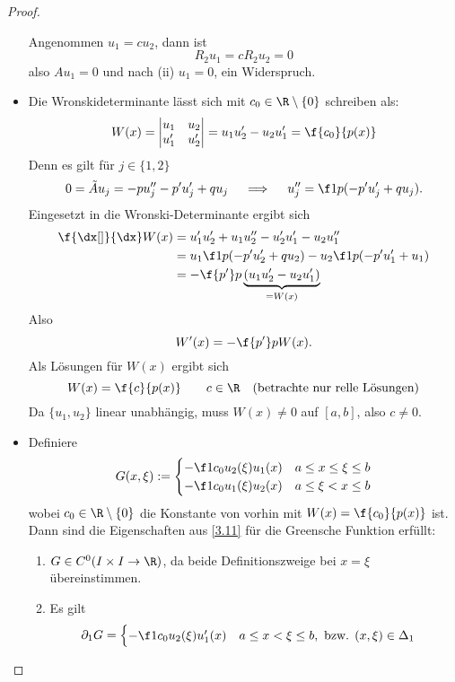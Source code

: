 \begin{st}
\begin{proof}
\begin{seg}[(ii)$\implies$(i)]
\begin{itemize}
					Angenommen $u_1 = c u_2$, dann ist
					\[
						R_2 u_1 = c R_2 u_2 = 0
					\]
					also $Au_1 = 0$ und nach (ii) $u_1 = 0$, ein Widerspruch.
				\item
					Die Wronskideterminante lässt sich mit $c_0 \in \R \setminus \{0\}$ schreiben als:
					\[
						W(x) = \begin{vmatrix}
							u_1 & u_2 \\
							u_1' & u_2'
						\end{vmatrix}
						= u_1u_2' - u_2u_1' = \f {c_0}{p(x)}
					\]
					Denn es gilt für $j\in \{1,2\}$
					\[
						0 = \tilde A u_j = -pu_j'' - p'u_j' + qu_j
						\quad\implies\quad
						u_j'' = \f 1{p}(-p'u_j' + qu_j).
					\]
					Eingesetzt in die Wronski-Determinante ergibt sich
					\begin{align*}
						\f {\dx[]}{\dx} W(x) 
						&= u_1'u_2' + u_1u_2'' - u_2'u_1' - u_2u_1'' \\
						&= u_1 \f 1p (-p'u_2' + qu_2) - u_2 \f 1p (-p'u_1' + u_1) \\
						&= -\f {p'}p \underbrace{(u_1u_2' - u_2u_1')}_{=W(x)} \\
					\end{align*}
					Also
					\[
						W'(x) = - \f {p'}p W(x).
					\]
					Als Lösungen für $W(x)$ ergibt sich
					\[
						W(x) = \f {c}{p(x)} 
						\qquad c\in \R \quad \text{(betrachte nur relle Lösungen)}
					\]
					Da $\{u_1,u_2\}$ linear unabhängig, muss $W(x) \neq 0$ auf $[a,b]$, also $c\neq 0$.
				\item
					Definiere
					\[
						G(x,\xi) := \begin{cases}
							-\f 1{c_0} u_2(\xi)u_1(x) & a \le x \le \xi \le b \\
							-\f 1{c_0} u_1(\xi)u_2(x) & a \le \xi < x \le b
						\end{cases}
					\]
					wobei $c_0 \in \R \setminus \{0\}$ die Konstante von vorhin mit $W(x) = \f {c_0}{p(x)}$ ist.
					Dann sind die Eigenschaften aus \ref{3.11} für die Greensche Funktion erfüllt:
					\begin{enumerate}[1)]
						\item
							$G \in C^0(I \times I \to \R)$, da beide Definitionszweige bei $x = \xi$ übereinstimmen.
						\item
							Es gilt
							\begin{align*}
								\partial_1 G &= \begin{cases}
									-\f 1{c_0} u_2(\xi) u_1'(x) & a \le x < \xi \le b, \text{ bzw. $(x,\xi) \in \Delta_1$} \\

\end{cases}
\end{align*}
\end{enumerate}
\end{itemize}
\end{seg}
\end{proof}
\end{st}
